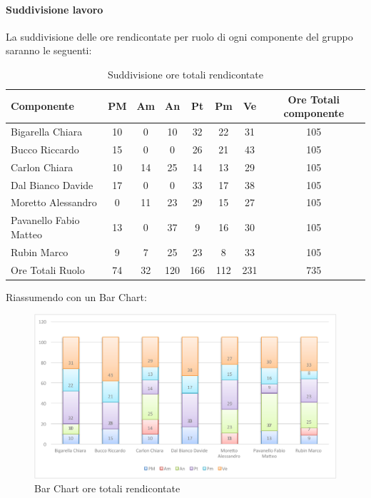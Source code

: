 			\paragraph{Suddivisione lavoro}
				La suddivisione delle ore rendicontate per ruolo di ogni componente del gruppo \groupname{} saranno le seguenti:
				\begin{table}[H]
					\begin{center}
						\begin{tabular}{| l | c | c | c | c | c | c | c |}
							\hline
							Componente 				& PM	& Am 	& An 	& Pt 		& Pm 	& Ve 	& Ore Totali componente \\ \hline
							
							Bigarella Chiara 			& 10 		& 0		& 10 		& 32 		& 22 		& 31 		& 105 \\
							Bucco Riccardo 			& 15 		& 0		& 0		& 26 		& 21		& 43 		& 105 \\
							Carlon Chiara	 			& 10 		& 14 		& 25 		& 14 		& 13 		& 29 		& 105 \\
							Dal Bianco Davide 			& 17 		& 0		& 0		& 33 		& 17 		& 38 		& 105 \\
							Moretto Alessandro 			& 0		& 11 		& 23 		& 29 		& 15 		& 27 		& 105 \\
							Pavanello Fabio Matteo	 	& 13 		& 0		& 37 		& 9 		& 16 		& 30 		& 105 \\
							Rubin Marco				& 9 		& 7 		& 25 		& 23 		& 8 		& 33		& 105 \\ \hline \hline
							
							Ore Totali Ruolo 			& 74 		& 32 		& 120 	& 166 	& 112 	& 231 	& 735\\ \hline
						\end{tabular}
					\end{center}
					\caption{Suddivisione ore totali rendicontate}
				\end{table}
				Riassumendo con un Bar Chart:
				\begin{figure}[H]\centering
					\includegraphics[width=\textwidth]{PianoDiProgetto/Pics/ChartOreRendic.pdf}
					\caption{Bar Chart ore totali rendicontate}
				\end{figure}
